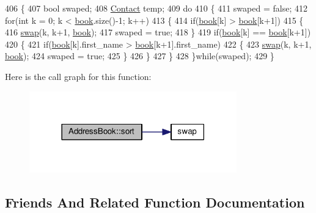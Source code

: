 \begin{DoxyCode}
406 \{
407    \textcolor{keywordtype}{bool} swaped;
408    \hyperlink{classContact}{Contact} temp;
409    \textcolor{keywordflow}{do}
410    \{
411       swaped = \textcolor{keyword}{false};
412       \textcolor{keywordflow}{for}(\textcolor{keywordtype}{int} k = 0; k < \hyperlink{classAddressBook_a4f15fc599aaafa71de6eb897e2565baa}{book}.size()-1; k++)
413       \{
414          \textcolor{keywordflow}{if}(\hyperlink{classAddressBook_a4f15fc599aaafa71de6eb897e2565baa}{book}[k] > \hyperlink{classAddressBook_a4f15fc599aaafa71de6eb897e2565baa}{book}[k+1])
415          \{
416             \hyperlink{classAddressBook_a5cd138fa046f34ab9825f38080786c77}{swap}(k, k+1, \hyperlink{classAddressBook_a4f15fc599aaafa71de6eb897e2565baa}{book});
417             swaped = \textcolor{keyword}{true};
418          \}
419          \textcolor{keywordflow}{if}(\hyperlink{classAddressBook_a4f15fc599aaafa71de6eb897e2565baa}{book}[k] == \hyperlink{classAddressBook_a4f15fc599aaafa71de6eb897e2565baa}{book}[k+1])
420          \{
421             \textcolor{keywordflow}{if}(\hyperlink{classAddressBook_a4f15fc599aaafa71de6eb897e2565baa}{book}[k].first\_name > \hyperlink{classAddressBook_a4f15fc599aaafa71de6eb897e2565baa}{book}[k+1].first\_name)
422             \{
423                \hyperlink{classAddressBook_a5cd138fa046f34ab9825f38080786c77}{swap}(k, k+1, \hyperlink{classAddressBook_a4f15fc599aaafa71de6eb897e2565baa}{book});
424                swaped = \textcolor{keyword}{true};
425             \}
426          \}
427       \}
428    \}\textcolor{keywordflow}{while}(swaped);
429 \}
\end{DoxyCode}


Here is the call graph for this function\+:
\nopagebreak
\begin{figure}[H]
\begin{center}
\leavevmode
\includegraphics[width=254pt]{classAddressBook_a7021de85815ec3aed9d2173fc15faa9b_cgraph}
\end{center}
\end{figure}




\subsection{Friends And Related Function Documentation}
